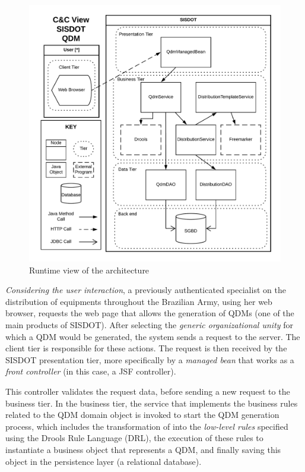 \begin{figure}
\includegraphics[scale=0.70]{img/runtimeView_qdm.png}
\caption{Runtime view of the architecture} 
\label{fig:fig:runtime_qdm}
\end{figure}

\emph{Considering the user interaction}, a previously authenticated specialist on the 
distribution of equipments throughout the Brazilian Army, using her web browser, 
requests the web page that allows the generation of QDMs (one of the main products of SISDOT). 
After selecting the \emph{generic organizational unity} for which a QDM would be 
generated, the system sends a request to the server. The client tier is responsible for these actions. 
The request is then received by the SISDOT presentation tier, more specifically by a \emph{managed bean} that works 
as a \emph{front controller} (in this case, a JSF controller). 

This controller validates  
the request data, before sending a new request to the business tier. In the business tier, the service 
that implements the business rules related to the QDM domain object is invoked to start the QDM generation process, 
which includes the transformation of \callers into the \emph{low-level rules} specified using the Drools Rule Language (DRL), 
the execution of these rules to instantiate a business object that represents a QDM, and finally saving this 
object in the persistence layer (a relational database). 


